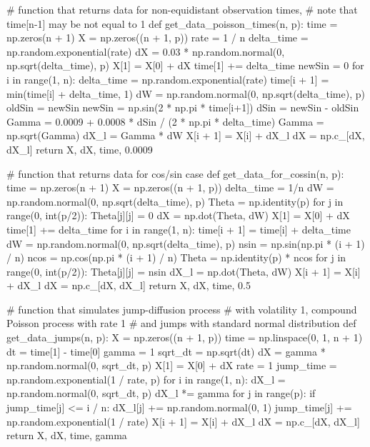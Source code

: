 \documentclass[a4paper,11pt]{book}
\theoremstyle{plain}
\theoremstyle{definition}
\begin{document}
\begin{python}
# function that returns data for non-equidistant observation times,
# note that time[n-1] may be not equal to 1 
def get_data_poisson_times(n, p):
    time = np.zeros(n + 1)
    X = np.zeros((n + 1, p))
    rate = 1 / n
    delta_time = np.random.exponential(rate)
    dX = 0.03 * np.random.normal(0, np.sqrt(delta_time), p)
    X[1] = X[0] + dX
    time[1] += delta_time
    newSin = 0
    for i in range(1, n):
        delta_time = np.random.exponential(rate)
        time[i + 1] = min(time[i] + delta_time, 1)
        dW = np.random.normal(0, np.sqrt(delta_time), p)
        oldSin = newSin
        newSin = np.sin(2 * np.pi * time[i+1])
        dSin = newSin - oldSin
        Gamma = 0.0009 + 0.0008 * dSin / (2 * np.pi * delta_time)
        Gamma = np.sqrt(Gamma)
        dX_l = Gamma * dW
        X[i + 1] = X[i] + dX_l
        dX = np.c_[dX, dX_l]
    return X, dX, time, 0.0009
    
    
# function that returns data for cos/sin case 
def get_data_for_cossin(n, p):
    time = np.zeros(n + 1)
    X = np.zeros((n + 1, p))
    delta_time = 1/n
    dW = np.random.normal(0, np.sqrt(delta_time), p)
    Theta = np.identity(p)
    for j in range(0, int(p/2)):
    Theta[j][j] = 0
    dX = np.dot(Theta, dW)
    X[1] = X[0] + dX
    time[1] += delta_time
    for i in range(1, n):
        time[i + 1] = time[i] + delta_time
        dW = np.random.normal(0, np.sqrt(delta_time), p)
        nsin = np.sin(np.pi * (i + 1) / n)
        ncos = np.cos(np.pi * (i + 1) / n)
        Theta = np.identity(p) * ncos
        for j in range(0, int(p/2)):
            Theta[j][j] = nsin
        dX_l = np.dot(Theta, dW)
        X[i + 1] = X[i] + dX_l
        dX = np.c_[dX, dX_l]
return X, dX, time, 0.5    
    

# function that simulates jump-diffusion process
# with volatility 1, compound Poisson process with rate 1
# and jumps with standard normal distribution
def get_data_jumps(n, p):
    X = np.zeros((n + 1, p))
    time = np.linspace(0, 1, n + 1)
    dt = time[1] - time[0]
    gamma = 1
    sqrt_dt = np.sqrt(dt)
    dX = gamma * np.random.normal(0, sqrt_dt, p)
    X[1] = X[0] + dX
    rate = 1
    jump_time = np.random.exponential(1 / rate, p)
    for i in range(1, n):
        dX_l = np.random.normal(0, sqrt_dt, p)
        dX_l *= gamma
        for j in range(p):
            if jump_time[j] <= i / n:
                dX_l[j] += np.random.normal(0, 1)
                jump_time[j] += np.random.exponential(1 / rate)
        X[i + 1] = X[i] + dX_l
        dX = np.c_[dX, dX_l]
    return X, dX, time, gamma



\end{python}
\end{document}
